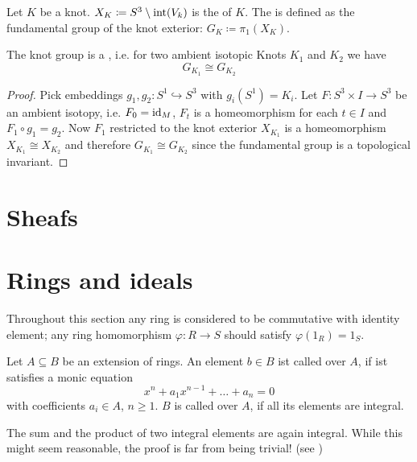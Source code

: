 \begin{definition}
	Let $K$ be a knot. $X_K \coloneqq S^3 \setminus \operatorname{int}(V_k)$ is the  of $K$.
	The  is defined as the fundamental group of the knot exterior: $G_K \coloneqq \pi_1(X_K)$.
\end{definition}

\begin{lemma}
	The knot group is a , i.e. for two ambient isotopic Knots $K_1$ and $K_2$ we have
	\[
		G_{K_1} \cong G_{K_2}
	\]
\end{lemma}
\begin{proof}
	Pick embeddings $g_1, g_2 \colon S^1 \hookrightarrow S^3$ with $g_i(S^1)=K_i$.
	Let $F \colon S^3 \times I \to S^3$ be an ambient isotopy, i.e. $F_0 = {\operatorname{id}_M}$, $F_t$ is a homeomorphism for each $t \in I$ and $F_1 \circ g_1 = g_2$.
	Now $F_1$ restricted to the knot exterior $X_{K_1}$ is a homeomorphism $X_{K_1} \cong X_{K_2}$ and therefore $G_{K_1} \cong G_{K_2}$ since the fundamental group is a topological invariant.
\end{proof}





\section{Sheafs} %
\label{sec:sheafs}



\section{Rings and ideals} %
\label{sec:rings_and_ideals}
Throughout this section any ring is considered to be commutative with identity element; any ring homomorphism $\varphi \colon R \to S$ should satisfy $\varphi(1_R) =1_S$.

\begin{definition}[{name=[Integral Elements]{\cite[Def.~2.1]{neukirch}}}]
	Let $A \subseteq B$ be an extension of rings.
	An element $b \in B$ ist called  over $A$, if ist satisfies a monic equation
	\[
		x^n + a_1 x^{n-1} + \ldots + a_n = 0
	\]
	with coefficients $a_i \in A$, $n\ge 1$.
	$B$ is called  over $A$, if all its elements are integral.
\end{definition}

\begin{remark}
	The sum and the product of two integral elements are again integral.
	While this might seem reasonable, the proof is far from being trivial! (see \cite[Prop.~2.2]{neukirch})
\end{remark}

